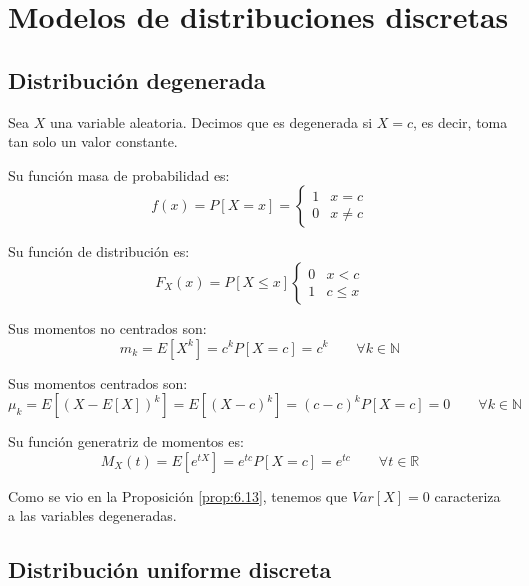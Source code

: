 \chapter{Modelos de distribuciones discretas}
\section{Distribución degenerada}

\begin{definicion}
    Sea $X$ una variable aleatoria. Decimos que es degenerada si $X=c$, es decir, toma tan solo un valor constante.
\end{definicion}

Su función masa de probabilidad es:
\begin{equation*}
    f(x) = P[X=x] = \left\{\begin{array}{cc}
        1 & x=c \\
        0 & x\neq c
    \end{array}\right.
\end{equation*}

Su función de distribución es:
\begin{equation*}
    F_X(x) = P[X\leq x] \left\{\begin{array}{cc}
        0 & x<c \\
        1 & c\leq x
    \end{array}\right.
\end{equation*}

Sus momentos no centrados son:
\begin{equation*}
    m_k = E[X^k] = c^kP[X=c] = c^k \qquad \forall k\in \mathbb{N}
\end{equation*}

Sus momentos centrados son:
\begin{equation*}
    \mu_k = E[(X-E[X])^k]
    = E[(X-c)^k] = (c-c)^kP[X=c] = 0    
    \qquad \forall k\in \mathbb{N}
\end{equation*}

Su función generatriz de momentos es:
\begin{equation*}
    M_X(t) = E[e^{tX}] = e^{tc}P[X=c] = e^{tc}    
    \qquad \forall t\in \mathbb{R}
\end{equation*}


Como se vio en la Proposición \ref{prop:6.13}, tenemos que $Var[X]=0$ caracteriza a las variables degeneradas.

\section{Distribución uniforme discreta}

